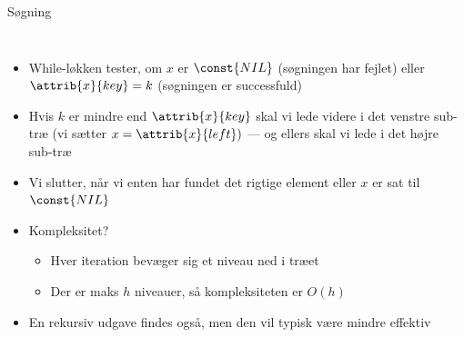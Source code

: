 \documentclass[aspectratio=1610]{beamer}
\begin{document}
\begin{frame}{Søgning}{}
\begin{columns}
        \begin{itemize}
            \small
            \item<2-> While-løkken tester, om $x$ er $\const{NIL}$ (søgningen har
                fejlet) eller $\attrib{x}{key} = k$ (søgningen er successfuld)
            \item<3-> Hvis $k$ er mindre end $\attrib{x}{key}$ skal vi lede videre i
                det venstre sub-træ (vi sætter $x = \attrib{x}{left})$ --- og
                ellers skal vi lede i det højre sub-træ
            \item<4-> Vi slutter, når vi enten har fundet det rigtige element eller
                $x$ er sat til $\const{NIL}$
            \item<5-> Kompleksitet?
                \begin{itemize}
                    \item<6-> Hver iteration bevæger sig et niveau ned i træet
                    \item<7-> Der er maks $h$ niveauer, så kompleksiteten er
                        $O(h)$
                \end{itemize}
            \item<8-> En rekursiv udgave findes også, men den vil typisk være
                mindre effektiv
        \end{itemize}
    \end{columns}
\end{frame}
\end{document}
